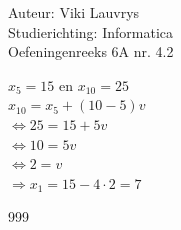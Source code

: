 \documentclass[a4paper]{article}
\begin{document}
  
\noindent \large Auteur: Viki	Lauvrys \\
\noindent \large Studierichting: Informatica\\
\noindent \large Oefeningenreeks 6A nr. 4.2\\

\medskip

\normalsize

$ x_5 = 15 $ en $ x_{10} = 25 $ \\

$ x_{10} = x_5 + (10 - 5)v $ \\

$ \Leftrightarrow 25 = 15 + 5v $ \\

$ \Leftrightarrow 10 = 5v $ \\

$ \Leftrightarrow 2 = v $ \\

$ \Rightarrow x_1 = 15 - 4 \cdot 2 = 7$ \\

\begin{thebibliography}{999}
\end{thebibliography}
\end{document}
